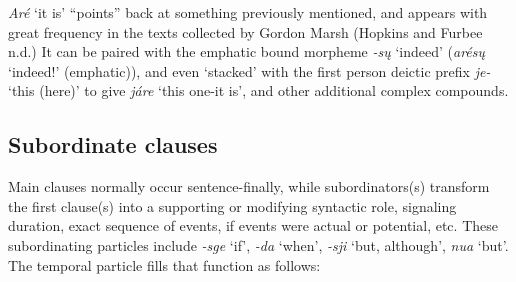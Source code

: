 \documentclass[output=paper]{LSP/langsci}
\begin{document}
\begin{table}
\caption{Comparison of demonstrative pronouns to deictic directional prefixes} \label{demonstrative}
\end{table}

\textit{Ar\'e} `it is' ``points'' back at something previously mentioned, and appears with great frequency in the texts collected by Gordon Marsh (Hopkins and Furbee n.d.)  It can be paired with the emphatic bound morpheme \textit{-s\k{u}} `indeed' (\textit{ar\'es\k{u}} `indeed!' (emphatic)), and even `stacked' with the first person deictic prefix \textit{je-} `this (here)' to give \textit{járe} `this one-it is', and other additional complex compounds.    

\subsection{Subordinate clauses}
Main clauses normally occur sentence-finally, while subordinators(s) transform the first clause(s) into a supporting or modifying syntactic role, signaling duration, exact sequence of events, if events were actual or potential, etc. These subordinating particles include \textit{-sge} `if', \textit{-da} `when',  \textit{-sji}  `but, although', \textit{nua} `but'.   The temporal particle fills that function as follows:
\end{document}
